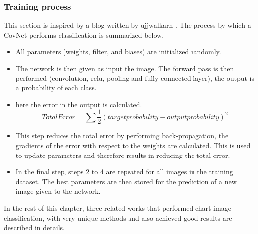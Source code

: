 \documentclass[12pt, a4paper,oneside]{report}
\begin{document}
\subsubsection{Training process}
This section is inspired by a blog written by ujjwalkarn \cite{cnnonline}.
The process by which a CovNet performs classification is summarized below.

\begin{itemize}
	\item All parameters (weights, filter, and biases) are initialized randomly.
	\item The network is then given as input the image. The forward pass is then performed (convolution, relu, pooling and fully connected layer),  the output is a probability of each class.
	\item here the error in the output is calculated.
	\[Total Error = \sum  \frac{1}{2} (target probability - output probability) ^2 \]
	\item This step reduces the total error by performing back-propagation, the gradients of the error with respect to the weights are calculated. This is used to update parameters and therefore results in reducing the total error.
	\item In the final step, steps 2 to 4 are repeated for all images in the training dataset. The best parameters are then stored for the prediction of a new image given to the network.\newline 
	
\end{itemize} 

In the rest of this chapter, three related works that performed chart image classification, with very unique methods and also achieved good results are described in details.  
\end{document}
